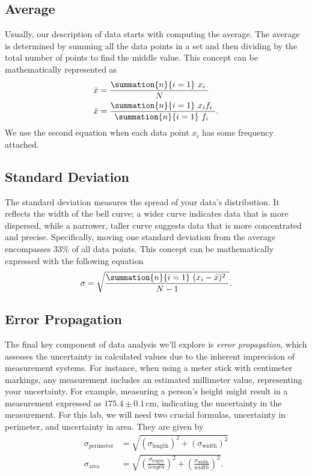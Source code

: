 \documentclass{report}
\begin{document}
    \bigbreak \noindent 
    \subsection{Average}
    \bigbreak \noindent 
    Usually, our description of data starts with computing the average. The average is determined by summing all the data points in a set and then dividing by the total number of points to find the middle value. This concept can be mathematically represented as
    \begin{align*}
        &\bar{x} = \frac{\summation{n}{i=1}\ x_{i}\ }{N} \\
        &\bar{x} =\frac{\summation{n}{i=1}\ x_{i}f_{i}\ }{\summation{n}{i=1}\ f_{i}\ } 
    .\end{align*}
    \bigbreak \noindent 
    We use the second equation when each data point $x_{i}$ has some frequency attached.

    \bigbreak \noindent 
    \subsection{Standard Deviation}
    \bigbreak \noindent 
    The standard deviation measures the spread of your data's distribution. It reflects the width of the bell curve; a wider curve indicates data that is more dispersed, while a narrower, taller curve suggests data that is more concentrated and precise. Specifically, moving one standard deviation from the average encompasses 33\% of all data points. This concept can be mathematically expressed with the following equation
    \begin{align*}
        \sigma = \sqrt{\frac{\summation{n}{i=1}\ (x_{i} - \bar{x})^{2}\ }{N-1}}
    .\end{align*}
    \bigbreak \noindent 
    \subsection{Error Propagation}
    \bigbreak \noindent 
    The final key component of data analysis we'll explore is \textit{error propagation}, which assesses the uncertainty in calculated values due to the inherent imprecision of measurement systems. For instance, when using a meter stick with centimeter markings, any measurement includes an estimated millimeter value, representing your uncertainty. For example, measuring a person's height might result in a measurement expressed as $175.4 \pm 0.1\, \si{\centi\meter}$, indicating the uncertainty in the measurement.
    \bigbreak \noindent 
    For this lab, we will need two crucial formulas, uncertainty in perimeter, and uncertainty in area. They are given by 
    \begin{align*}
        \sigma_{\text{perimeter}} &= \sqrt{(\sigma_{\text{length}})^{2} + (\sigma_{\text{width}})^{2}} \\
        \sigma_{\text{area}}&= \sqrt{\left(\frac{\sigma_{\text{length}}}{length}\right)^{2} + \left(\frac{\sigma_{\text{width}}}{width}\right)^{2}}
    .\end{align*}
\end{document}
